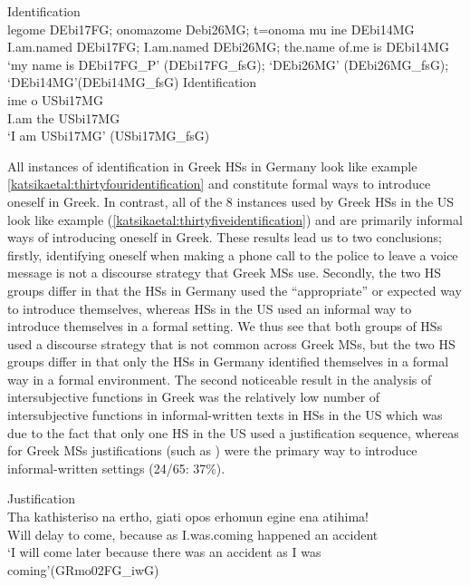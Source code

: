 \documentclass[output=paper,colorlinks,citecolor=brown]{langscibook}
\begin{document}
\ea Identification\\ \label{katsikaetal:thirtyfouridentification}
\gll legome DEbi17FG; onomazome Debi26MG; t=onoma mu ine DEbi14MG\\
     I.am.named DEbi17FG; I.am.named DEbi26MG; the.name of.me is DEbi14MG\\
\glt `my name is DEbi17FG\_P' (DEbi17FG\_fsG); `DEbi26MG' (DEbi26MG\_fsG); `DEbi14MG’(DEbi14MG\_fsG)
\z
\newpage
\ea Identification\\ \label{katsikaetal:thirtyfiveidentification}
\gll ime o USbi17MG\\
     I.am the USbi17MG\\
\glt `I am USbi17MG’ (USbi17MG\_fsG)
\z

All instances of identification in Greek HSs in Germany look like example \ref{katsikaetal:thirtyfouridentification} and constitute formal ways to introduce oneself in Greek. In contrast, all of the 8 instances used by Greek HSs in the US look like example (\ref{katsikaetal:thirtyfiveidentification}) and are primarily informal ways of introducing oneself in Greek. These results lead us to two conclusions; firstly, identifying oneself when making a phone call to the police to leave a voice message is not a discourse strategy that Greek MSs use. Secondly, the two HS groups differ in that the HSs in Germany used the “appropriate” or expected way to introduce themselves, whereas HSs in the US used an informal way to introduce themselves in a formal setting. We thus see that both groups of HSs used a discourse strategy that is not common across Greek MSs, but the two HS groups differ in that only the HSs in Germany identified themselves in a formal way in a formal environment. 
The second noticeable result in the analysis of intersubjective functions in Greek was the relatively low number of intersubjective functions in informal-written texts in HSs in the US which was due to the fact that only one HS in the US used a justification sequence, whereas for Greek MSs justifications (such as ) were the primary way to introduce informal-written settings (24/65: 37\%).

\ea Justification\\ \label{katsikaetal:thirtysixjustification}
\gll Tha  kathisteriso na ertho, giati   opos erhomun      egine    ena atihima!\\
     Will delay        to come,  because as   I.was.coming happened an  accident\\
\glt ‘I will come later because there was an accident as I was coming’(GRmo02FG\_iwG)
\z
\end{document}
